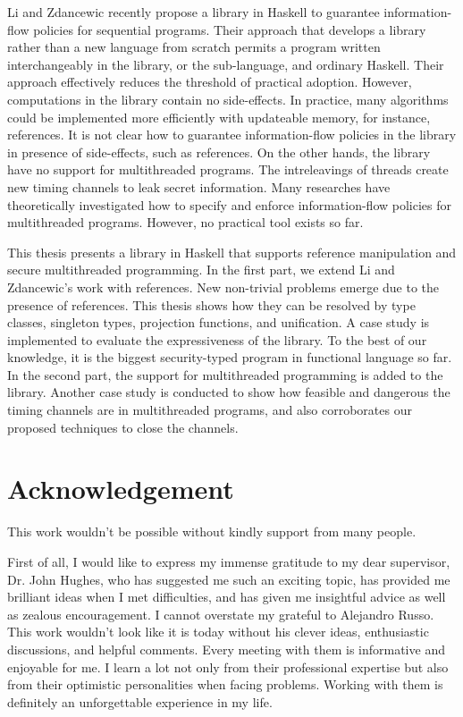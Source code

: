 \documentclass[a4paper]{report}
\begin{document}



Li and Zdancewic recently propose a library in Haskell to guarantee 
information-flow policies for sequential programs. 
Their approach that develops a library rather than a new language from scratch
permits a program written interchangeably 
in the library, or the sub-language, and ordinary Haskell.
Their approach effectively reduces the threshold of practical adoption.
However, computations in the library contain no side-effects.
In practice, many algorithms could be implemented more efficiently with 
updateable memory, for instance, references. 
It is not clear how to guarantee information-flow policies in the library 
in presence of side-effects, such as references.
On the other hands, the library have no support for multithreaded programs.
The intreleavings of threads create new timing channels to leak secret information.
Many researches have theoretically investigated how to specify and enforce information-flow 
policies for multithreaded programs. However, no practical tool exists so far.

This thesis presents a library in Haskell that supports reference manipulation and 
secure multithreaded programming. 
In the first part, we extend Li and Zdancewic's work with references.
New non-trivial problems emerge due to the presence of references.
This thesis shows how they can be resolved by type classes, singleton types, 
projection functions, and unification.
A case study is implemented to evaluate the expressiveness of the library.
To the best of our knowledge, it is the biggest security-typed
program in functional language so far.
In the second part, the support for multithreaded programming is added to the library.
Another case study is conducted to show how feasible and dangerous the timing channels are
in multithreaded programs, and also corroborates our proposed techniques to close the
channels. 



\chapter*{Acknowledgement}

This work wouldn't be possible without kindly support from many people.

First of all, I would like to express my immense gratitude to my dear supervisor, 
Dr. John Hughes, who has suggested me such an exciting topic, has provided me brilliant ideas
when I met difficulties, and has given me insightful advice as well as zealous encouragement.
I cannot overstate my grateful to Alejandro Russo. This work wouldn't look like it is today
without his clever ideas, enthusiastic discussions, and helpful comments.
Every meeting with them is informative and enjoyable for me.  
I learn a lot not only from their professional expertise but also from their optimistic personalities
when facing problems.
Working with them is definitely an unforgettable experience in my life.
\end{document}
